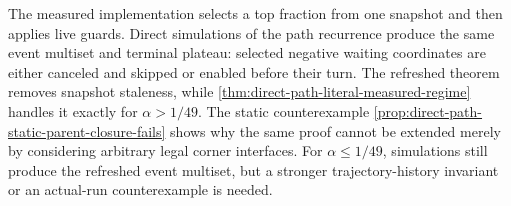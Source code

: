 \begin{remark}
The measured implementation selects a top fraction from one snapshot and
then applies live guards. Direct simulations of the path recurrence produce
the same event multiset and terminal plateau: selected negative waiting
coordinates are either canceled and skipped or enabled before their turn.
The refreshed theorem removes snapshot staleness, while
\cref{thm:direct-path-literal-measured-regime} handles it exactly for
$\alpha>1/49$.  The static counterexample
\cref{prop:direct-path-static-parent-closure-fails} shows why the same proof
cannot be extended merely by considering arbitrary legal corner interfaces.
For $\alpha\leq1/49$, simulations still produce the refreshed event multiset,
but a stronger trajectory-history invariant or an actual-run counterexample
is needed.
\end{remark}
